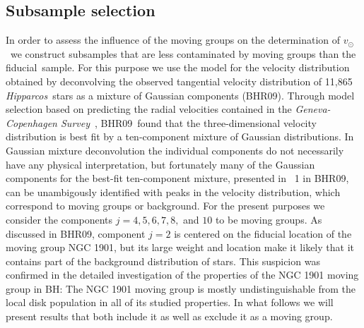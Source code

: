 \documentclass[12pt,preprint]{aastex}
\newcommand{\Hipparcos}{\textsl{Hipparcos}}
\newcommand{\gcs}{\textit{Geneva-Copenhagen Survey}}
\newcommand{\vsunlsr}{\ensuremath{v_\odot}}
\newcommand{\bhr}{BHR09}
\newcommand{\fiducial}{fiducial}
\newcommand{\bh}{BH}
\begin{document}
\subsection{Subsample selection}

In order to assess the influence of the moving groups on the
determination of \vsunlsr\ we construct subsamples that are less
contaminated by moving groups than the \fiducial\ sample. For this
purpose we use the model for the velocity distribution obtained by
deconvolving the observed tangential velocity distribution of 11,865
\Hipparcos\ stars as a mixture of Gaussian components (\bhr). Through
model selection based on predicting the radial velocities contained in
the \gcs\ \citep{Nordstroem04a}, \bhr\ found that the
three-dimensional velocity distribution is best fit by a ten-component
mixture of Gaussian distributions. In Gaussian mixture deconvolution
the individual components do not necessarily have any physical
interpretation, but fortunately many of the Gaussian components for
the best-fit ten-component mixture, presented in \tablename~1 in \bhr,
can be unambigously identified with peaks in the velocity
distribution, which correspond to moving groups or background. For the
present purposes we consider the components $j= 4,5,6,7,8,$ and $10$
to be moving groups. As discussed in \bhr, component $j=2$ is centered
on the fiducial location of the moving group NGC 1901, but its large
weight and location make it likely that it contains part of the
background distribution of stars. This suspicion was confirmed in the
detailed investigation of the properties of the NGC 1901 moving group
in \bh: The NGC 1901 moving group is mostly undistinguishable from the
local disk population in all of its studied properties. In what
follows we will present results that both include it as well as
exclude it as a moving group.
\end{document}
